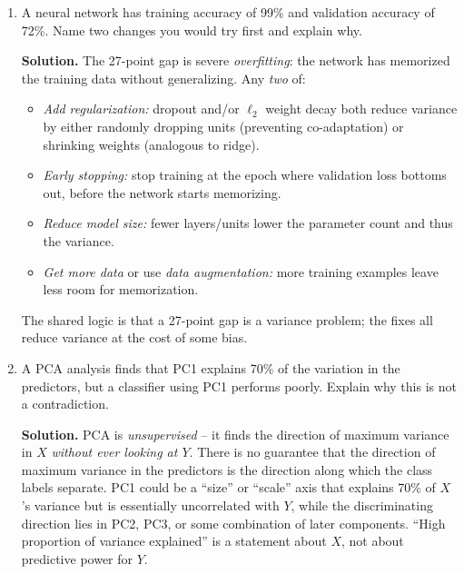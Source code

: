\documentclass[11pt]{article}
\newcommand{\solution}[1]{%
  \par\medskip\noindent\textbf{Solution.} #1\par\medskip
}
\begin{document}
\begin{enumerate}[leftmargin=*]
\solution{Early trees reduce \emph{bias} by correcting residual structure that the existing ensemble has not captured; validation error falls. After enough trees, the residuals are mostly noise rather than structure, so subsequent trees fit that noise and \emph{variance} dominates -- validation error rises. This is overfitting, and unlike random forests, boosting can overfit if $B$ is too large.\\
Choose the number of trees at the \emph{minimum of the validation (or CV) error curve}, ideally with early stopping during fitting. A simpler, slightly more conservative version is the ``one-standard-error'' rule: pick the smallest $B$ whose CV error is within one SE of the minimum.}

\item A neural network has training accuracy of 99\% and validation accuracy of 72\%. Name two changes you would try first and explain why.

\solution{The 27-point gap is severe \emph{overfitting}: the network has memorized the training data without generalizing. Any \emph{two} of:
\begin{itemize}
\item \emph{Add regularization:} dropout and/or $\ell_2$ weight decay both reduce variance by either randomly dropping units (preventing co-adaptation) or shrinking weights (analogous to ridge).
\item \emph{Early stopping:} stop training at the epoch where validation loss bottoms out, before the network starts memorizing.
\item \emph{Reduce model size:} fewer layers/units lower the parameter count and thus the variance.
\item \emph{Get more data} or use \emph{data augmentation:} more training examples leave less room for memorization.
\end{itemize}
The shared logic is that a 27-point gap is a variance problem; the fixes all reduce variance at the cost of some bias.}

\item A PCA analysis finds that PC1 explains 70\% of the variation in the predictors, but a classifier using PC1 performs poorly. Explain why this is not a contradiction.

\solution{PCA is \emph{unsupervised} -- it finds the direction of maximum variance in $X$ \emph{without ever looking at $Y$}. There is no guarantee that the direction of maximum variance in the predictors is the direction along which the class labels separate. PC1 could be a ``size'' or ``scale'' axis that explains 70\% of $X$'s variance but is essentially uncorrelated with $Y$, while the discriminating direction lies in PC2, PC3, or some combination of later components. ``High proportion of variance explained'' is a statement about $X$, not about predictive power for $Y$.}


\end{enumerate}
\end{document}

